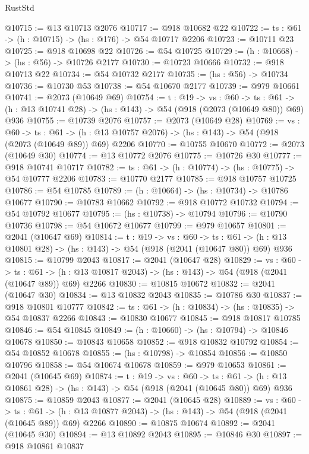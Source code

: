 \begin{lexlean}{RustStd}
\begin{coremodule}
@10715 := @13 @10713 @2076
@10717 := @918 @10682 @22
@10722 := {ts : @61} -> (h : @10715) -> (hs : @176) -> @54 @10717 @2206
@10723 := @10711 @23
@10725 := @918 @10698 @22
@10726 := @54 @10725
@10729 := (h : @10668) -> (hs : @56) -> @10726 @2177
@10730 := @10723 @10666
@10732 := @918 @10713 @22
@10734 := @54 @10732 @2177
@10735 := (hs : @56) -> @10734
@10736 := @10730 @53
@10738 := @54 @10670 @2177
@10739 := @979 @10661
@10741 := @2073 (@10649 @69)
@10754 := {t : @19} ->
  {vs : @60} ->
  {ts : @61} -> (h : @13 @10741 @28) -> (hs : @143) -> @54 (@918 (@2073 (@10649 @80)) @69) @936
@10755 := @10739 @2076
@10757 := @2073 (@10649 @28)
@10769 := {vs : @60} ->
  {ts : @61} -> (h : @13 @10757 @2076) -> (hs : @143) -> @54 (@918 (@2073 (@10649 @89)) @69) @2206
@10770 := @10755 @10670
@10772 := @2073 (@10649 @30)
@10774 := @13 @10772 @2076
@10775 := @10726 @30
@10777 := @918 @10741 @10717
@10782 := {ts : @61} -> (h : @10774) -> (hs : @10775) -> @54 @10777 @2206
@10783 := @10770 @2177
@10785 := @918 @10757 @10725
@10786 := @54 @10785
@10789 := (h : @10664) -> (hs : @10734) -> @10786 @10677
@10790 := @10783 @10662
@10792 := @918 @10772 @10732
@10794 := @54 @10792 @10677
@10795 := (hs : @10738) -> @10794
@10796 := @10790 @10736
@10798 := @54 @10672 @10677
@10799 := @979 @10657
@10801 := @2041 (@10647 @69)
@10814 := {t : @19} ->
  {vs : @60} ->
  {ts : @61} -> (h : @13 @10801 @28) -> (hs : @143) -> @54 (@918 (@2041 (@10647 @80)) @69) @936
@10815 := @10799 @2043
@10817 := @2041 (@10647 @28)
@10829 := {vs : @60} ->
  {ts : @61} -> (h : @13 @10817 @2043) -> (hs : @143) -> @54 (@918 (@2041 (@10647 @89)) @69) @2266
@10830 := @10815 @10672
@10832 := @2041 (@10647 @30)
@10834 := @13 @10832 @2043
@10835 := @10786 @30
@10837 := @918 @10801 @10777
@10842 := {ts : @61} -> (h : @10834) -> (hs : @10835) -> @54 @10837 @2266
@10843 := @10830 @10677
@10845 := @918 @10817 @10785
@10846 := @54 @10845
@10849 := (h : @10660) -> (hs : @10794) -> @10846 @10678
@10850 := @10843 @10658
@10852 := @918 @10832 @10792
@10854 := @54 @10852 @10678
@10855 := (hs : @10798) -> @10854
@10856 := @10850 @10796
@10858 := @54 @10674 @10678
@10859 := @979 @10653
@10861 := @2041 (@10645 @69)
@10874 := {t : @19} ->
  {vs : @60} ->
  {ts : @61} -> (h : @13 @10861 @28) -> (hs : @143) -> @54 (@918 (@2041 (@10645 @80)) @69) @936
@10875 := @10859 @2043
@10877 := @2041 (@10645 @28)
@10889 := {vs : @60} ->
  {ts : @61} -> (h : @13 @10877 @2043) -> (hs : @143) -> @54 (@918 (@2041 (@10645 @89)) @69) @2266
@10890 := @10875 @10674
@10892 := @2041 (@10645 @30)
@10894 := @13 @10892 @2043
@10895 := @10846 @30
@10897 := @918 @10861 @10837

\end{coremodule}
\end{lexlean}
